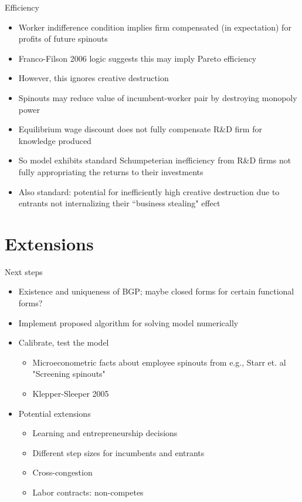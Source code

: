 \documentclass[english,usenames,dvipsnames]{beamer}
\begin{document}
\begin{frame}{Efficiency}
\begin{itemize}
	\small
	\item Worker indifference condition implies firm compensated (in expectation) for profits of future spinouts
	\item Franco-Filson 2006 logic suggests this may imply Pareto efficiency
	\item However, this ignores creative destruction
	\item Spinouts may reduce value of incumbent-worker pair by destroying monopoly power
	\item Equilibrium wage discount does not fully compensate R\&D firm for knowledge produced
	\item So model exhibits standard Schumpeterian inefficiency from R\&D firms not fully appropriating the returns to their investments
	\item Also standard: potential for inefficiently high creative destruction due to entrants not internalizing their ``business stealing" effect
\end{itemize}
\end{frame}


\section{Extensions}
\begin{frame}{Next steps}
\begin{itemize}
	\item Existence and uniqueness of BGP; maybe closed forms for certain functional forms? 
	\item Implement proposed algorithm for solving model numerically
	\item Calibrate, test the model
	\begin{itemize}
		\item Microeconometric facts about employee spinouts from e.g., Starr et. al "Screening spinouts"
		\item Klepper-Sleeper 2005
	\end{itemize}
	\item Potential extensions
	\begin{itemize}
		\item Learning and entrepreneurship decisions 
		\item Different step sizes for incumbents and entrants 
		\item Cross-congestion
		\item Labor contracts: non-competes
	\end{itemize}
\end{itemize}
\end{frame}
\end{document}
